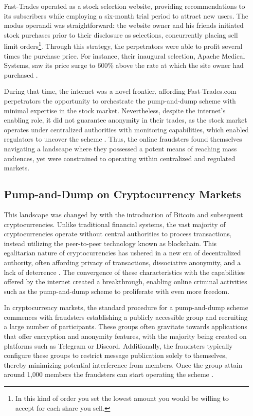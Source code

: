 \documentclass[12pt]{article}
\begin{document}
	Fast-Trades operated as a stock selection website, providing recommendations to its subscribers while employing a six-month trial period to attract new users.
	The modus operandi was straightforward: the website owner and his friends initiated stock purchases prior to their disclosure as selections, concurrently placing sell limit orders\footnote{In this kind of order you set the lowest amount you would be willing to accept for each share you sell.}.
	Through this strategy, the perpetrators were able to profit several times the purchase price.
	For instance, their inaugural selection, Apache Medical Systems, saw its price surge to 600\% above the rate at which the site owner had purchased \citep{kramer2005}.

	During that time, the internet was a novel frontier, affording Fast-Trades.com perpetrators the opportunity to orchestrate the pump-and-dump scheme with minimal expertise in the stock market.
	Nevertheless, despite the internet's enabling role, it did not guarantee anonymity in their trades, as the stock market operates under centralized authorities with monitoring capabilities, which enabled regulators to uncover the scheme \citep{kramer2005}.
	Thus, the online fraudsters found themselves navigating a landscape where they possessed a potent means of reaching mass audiences, yet were constrained to operating within centralized and regulated markets.
	
	\subsection{Pump-and-Dump on Cryptocurrency Markets}
	\label{subsec_pump_in_crypto}

	This landscape was changed by \citet{nakamoto2008} with the introduction of Bitcoin and subsequent cryptocurrencies.
	Unlike traditional financial systems, the vast majority of cryptocurrencies operate without central authorities to process transactions, instead utilizing the peer-to-peer technology known as blockchain.
	This egalitarian nature of cryptocurrencies has ushered in a new era of decentralized authority, often affording privacy of transactions, dissociative anonymity, and a lack of deterrence \citep{Kethineni2019}.
	The convergence of these characteristics with the capabilities offered by the internet created a breakthrough, enabling online criminal activities such as the pump-and-dump scheme to proliferate with even more freedom.

	In cryptocurrency markets, the standard procedure for a pump-and-dump scheme commences with fraudsters establishing a publicly accessible group and recruiting a large number of participants.
	These groups often gravitate towards applications that offer encryption and anonymity features, with the majority being created on platforms such as Telegram or Discord.
	Additionally, the fraudsters typically configure these groups to restrict message publication solely to themselves, thereby minimizing potential interference from members.
	Once the group attain around 1,000 members the fraudsters can start operating the scheme \citep{xu2019}.
\end{document}
